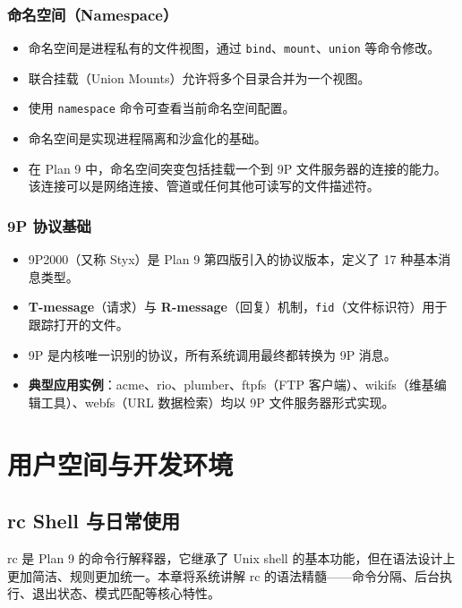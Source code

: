\documentclass[12pt,UTF8]{ctexbook}
\begin{document}
\section{命名空间（Namespace）}

\begin{itemize}
\item 命名空间是进程私有的文件视图，通过 \texttt{bind}、\texttt{mount}、\texttt{union} 等命令修改。
\item 联合挂载（Union Mounts）允许将多个目录合并为一个视图。
\item 使用 \texttt{namespace} 命令可查看当前命名空间配置。
\item 命名空间是实现进程隔离和沙盒化的基础。
\item 在 Plan 9 中，命名空间突变包括挂载一个到 9P 文件服务器的连接的能力。该连接可以是网络连接、管道或任何其他可读写的文件描述符。
\end{itemize}
	
\section{9P 协议基础}

\begin{itemize}
\item 9P2000（又称 Styx）是 Plan 9 第四版引入的协议版本，定义了 17 种基本消息类型。
\item \textbf{T-message}（请求）与 \textbf{R-message}（回复）机制，\texttt{fid}（文件标识符）用于跟踪打开的文件。
\item 9P 是内核唯一识别的协议，所有系统调用最终都转换为 9P 消息。
\item \textbf{典型应用实例}：acme、rio、plumber、ftpfs（FTP 客户端）、wikifs（维基编辑工具）、webfs（URL 数据检索）均以 9P 文件服务器形式实现。
\end{itemize}
	

\part{用户空间与开发环境}
	
\chapter{rc Shell 与日常使用}

rc 是 Plan 9 的命令行解释器，它继承了 Unix shell 的基本功能，但在语法设计上更加简洁、规则更加统一。本章将系统讲解 rc 的语法精髓——命令分隔、后台执行、退出状态、模式匹配等核心特性。
\end{document}
